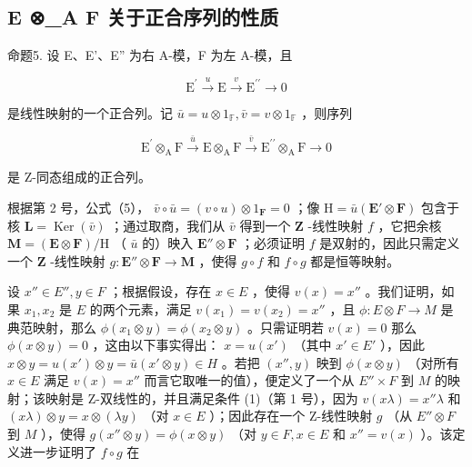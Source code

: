 \subsection{E ⊗\_A F 关于正合序列的性质}

命题5. 设 E、E'、E'' 为右 A-模，F 为左 A-模，且

\[
\mathrm{E} ^ {\prime} \stackrel {u} {\longrightarrow} \mathrm{E} \stackrel {v} {\longrightarrow} \mathrm{E} ^ {\prime \prime} \longrightarrow 0\tag{14}
\]

是线性映射的一个正合列。记 \(\bar{u} = u \otimes 1_{\mathbb{F}}, \bar{v} = v \otimes 1_{\mathbb{F}}\) ，则序列

\[
\mathrm{E} ^ {\prime} \otimes_ {\mathrm{A}} \mathrm{F} \xrightarrow {\bar {u}} \mathrm{E} \otimes_ {\mathrm{A}} \mathrm{F} \xrightarrow {\bar {v}} \mathrm{E} ^ {\prime \prime} \otimes_ {\mathrm{A}} \mathrm{F} \longrightarrow 0\tag{15}
\]

是 Z-同态组成的正合列。

根据第 2 号，公式（5）， \(\bar{v} \circ \bar{u} = (v \circ u) \otimes 1_{\mathbf{F}} = 0\) ；像 \(\mathrm{H} = \bar{u} (\mathbf{E}' \otimes \mathbf{F})\) 包含于核 \(\mathbf{L} = \operatorname{Ker}(\bar{v})\) ；通过取商，我们从 \(\bar{v}\) 得到一个 \(\mathbf{Z}\) -线性映射 \(f\) ，它把余核 \(\mathbf{M} = (\mathbf{E} \otimes \mathbf{F}) / \mathrm{H}\) （ \(\bar{u}\) 的）映入 \(\mathbf{E}'' \otimes \mathbf{F}\) ；必须证明 \(f\) 是双射的，因此只需定义一个 \(\mathbf{Z}\) -线性映射 \(g: \mathbf{E}'' \otimes \mathbf{F} \to \mathbf{M}\) ，使得 \(g \circ f\) 和 \(f \circ g\) 都是恒等映射。

设 \(x'' \in E'', y \in F\) ；根据假设，存在 \(x \in E\) ，使得 \(v(x) = x''\) 。我们证明，如果 \(x_1, x_2\) 是 \(E\) 的两个元素，满足 \(v(x_1) = v(x_2) = x''\) ，且 \(\phi: E \otimes F \to M\) 是典范映射，那么 \(\phi(x_1 \otimes y) = \phi(x_2 \otimes y)\) 。只需证明若 \(v(x) = 0\) 那么 \(\phi(x \otimes y) = 0\) ，这由以下事实得出： \(x = u(x')\) （其中 \(x' \in E'\) ），因此 \(x \otimes y = u(x') \otimes y = \bar{u}(x' \otimes y) \in H\) 。若把 \((x'', y)\) 映到 \(\phi(x \otimes y)\) （对所有 \(x \in E\) 满足 \(v(x) = x''\) 而言它取唯一的值），便定义了一个从 \(E'' \times F\) 到 \(M\) 的映射；该映射是 Z-双线性的，并且满足条件 (1)（第 1 号），因为 \(v(x\lambda) = x''\lambda\) 和 \((x\lambda) \otimes y = x \otimes (\lambda y)\) （对 \(x \in E\) ）；因此存在一个 Z-线性映射 \(g\) （从 \(E'' \otimes F\) 到 \(M\) ），使得 \(g(x'' \otimes y) = \phi(x \otimes y)\) （对 \(y \in F, x \in E\) 和 \(x'' = v(x)\) ）。该定义进一步证明了 \(f \circ g\) 在

